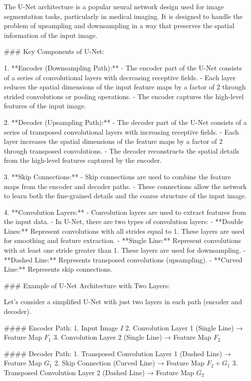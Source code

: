 The U-Net architecture is a popular neural network design used for image segmentation tasks, particularly in medical imaging. It is designed to handle the problem of upsampling and downsampling in a way that preserves the spatial information of the input image.

### Key Components of U-Net:

1. **Encoder (Downsampling Path):**
   - The encoder part of the U-Net consists of a series of convolutional layers with decreasing receptive fields.
   - Each layer reduces the spatial dimensions of the input feature maps by a factor of 2 through strided convolutions or pooling operations.
   - The encoder captures the high-level features of the input image.

2. **Decoder (Upsampling Path):**
   - The decoder part of the U-Net consists of a series of transposed convolutional layers with increasing receptive fields.
   - Each layer increases the spatial dimensions of the feature maps by a factor of 2 through transposed convolutions.
   - The decoder reconstructs the spatial details from the high-level features captured by the encoder.

3. **Skip Connections:**
   - Skip connections are used to combine the feature maps from the encoder and decoder paths.
   - These connections allow the network to learn both the fine-grained details and the coarse structure of the input image.

4. **Convolution Layers:**
   - Convolution layers are used to extract features from the input data.
   - In U-Net, there are two types of convolution layers:
     - **Double Lines:** Represent convolutions with all strides equal to 1. These layers are used for smoothing and feature extraction.
     - **Single Line:** Represent convolutions with at least one stride greater than 1. These layers are used for downsampling.
     - **Dashed Line:** Represents transposed convolutions (upsampling).
     - **Curved Line:** Represents skip connections.

### Example of U-Net Architecture with Two Layers:

Let's consider a simplified U-Net with just two layers in each path (encoder and decoder).

#### Encoder Path:
1. Input Image \( I \)
2. Convolution Layer 1 (Single Line) → Feature Map \( F_1 \)
3. Convolution Layer 2 (Single Line) → Feature Map \( F_2 \)

#### Decoder Path:
1. Transposed Convolution Layer 1 (Dashed Line) → Feature Map \( G_1 \)
2. Skip Connection (Curved Line) → Feature Map \( F_2 + G_1 \)
3. Transposed Convolution Layer 2 (Dashed Line) → Feature Map \( G_2 \)


